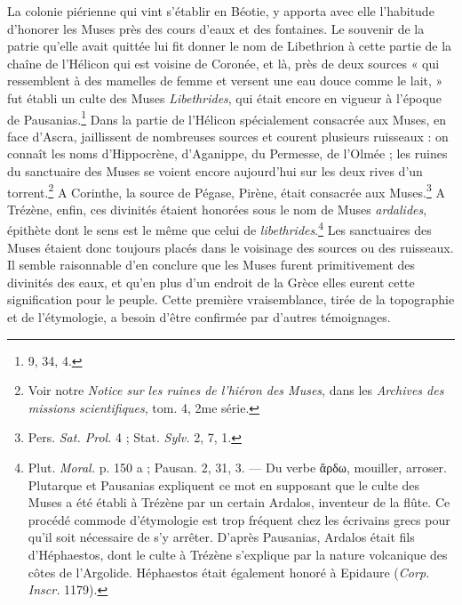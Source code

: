 \documentclass[landscape, a4paper, 11pt, oneside, polutonikogreek, french]{article}
\begin{document}
La colonie piérienne qui vint s'établir en Béotie, y apporta avec elle l'habitude d'honorer les Muses près des cours d'eaux et des fontaines. Le souvenir de la patrie qu'elle avait quittée lui fit donner le nom de Libethrion à cette partie de la chaîne de l'Hélicon qui est voisine de Coronée, et là, près de deux sources « qui ressemblent à des mamelles de femme et versent une eau douce comme le lait, » fut établi un culte des Muses \emph{Libethrides}, qui était encore en vigueur à l'époque de Pausanias.\footnote{9, 34, 4.} Dans la partie de l'Hélicon spécialement consacrée aux Muses, en face d'Ascra, jaillissent de nombreuses sources et courent plusieurs ruisseaux : on connaît les noms d'Hippocrène, d'Aganippe, du Permesse, de l'Olmée ; les ruines du sanctuaire des Muses se voient encore aujourd'hui sur les deux rives d'un torrent.\footnote{Voir notre \emph{Notice sur les ruines de l'hiéron des Muses}, dans les \emph{Archives des missions scientifiques}, tom. 4, 2me série.} A Corinthe, la source de Pégase, Pirène, était consacrée aux Muses.\footnote{Pers. \emph{Sat. Prol.} 4 ; Stat. \emph{Sylv.} 2, 7, 1.} A Trézène, enfin, ces divinités étaient honorées sous le nom de Muses \emph{ardalides}, épithète dont le sens est le même que celui de \emph{libethrides}.\footnote{Plut. \emph{Moral.} p. 150 a ; Pausan. 2, 31, 3. --- Du verbe ἄρδω, mouiller, arroser. Plutarque et Pausanias expliquent ce mot en supposant que le culte des Muses a été établi à Trézène par un certain Ardalos, inventeur de la flûte. Ce procédé commode d'étymologie est trop fréquent chez les écrivains grecs pour qu'il soit nécessaire de s'y arrêter. D'après Pausanias, Ardalos était fils d'Héphaestos, dont le culte à Trézène s'explique par la nature volcanique des côtes de l'Argolide. Héphaestos était également honoré à Epidaure (\emph{Corp. Inscr.} 1179).} Les sanctuaires des Muses étaient donc toujours placés dans le voisinage des sources ou des ruisseaux. Il semble raisonnable d'en conclure que les Muses furent primitivement des divinités des eaux, et qu'en plus d'un endroit de la Grèce elles eurent cette signification pour le peuple. Cette première vraisemblance, tirée de la topographie et de l'étymologie, a besoin d'être confirmée par d'autres témoignages.
\end{document}
